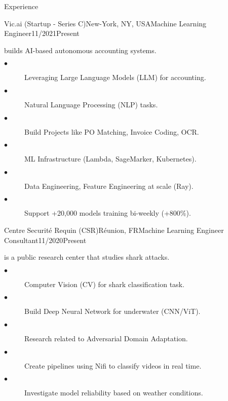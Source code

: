 \documentclass{resume}
\begin{document}
\begin{multicols}{2}
\begin{rSection}{\Large Experience}
		\begin{job}{Vic.ai (Startup - Series C)}{New-York, NY, USA}{Machine Learning Engineer}{11/2021}{Present}{
			builds AI-based autonomous accounting systems.
			\begin{description}
				\item[$\bullet$] Leveraging Large Language Models (LLM) for accounting.
				\item[$\bullet$] Natural Language Processing (NLP) tasks.
				\item[$\bullet$] Build Projects like PO Matching, Invoice Coding, OCR.
				\item[$\bullet$] ML Infrastructure (Lambda, SageMarker, Kubernetes).
				\item[$\bullet$] Data Engineering, Feature Engineering at scale (Ray).
				\item[$\bullet$] Support +20,000 models training bi-weekly (+800\%).
			\end{description}
		}
		\end{job}

		\begin{job}{Centre Securité Requin (CSR)}{Réunion, FR}{Machine Learning Engineer Consultant}{11/2020}{Present}{
			is a public research center that studies shark attacks.
			\begin{description}
				\item[$\bullet$] Computer Vision (CV) for shark classification task.
				\item[$\bullet$] Build Deep Neural Network for underwater (CNN/ViT).
				\item[$\bullet$] Research related to Adversarial Domain Adaptation.
				\item[$\bullet$] Create pipelines using Nifi to classify videos in real time.
				\item[$\bullet$] Investigate model reliability based on weather conditions.
			\end{description}
		}
		\end{job}


\end{rSection}
\end{multicols}
\end{document}
